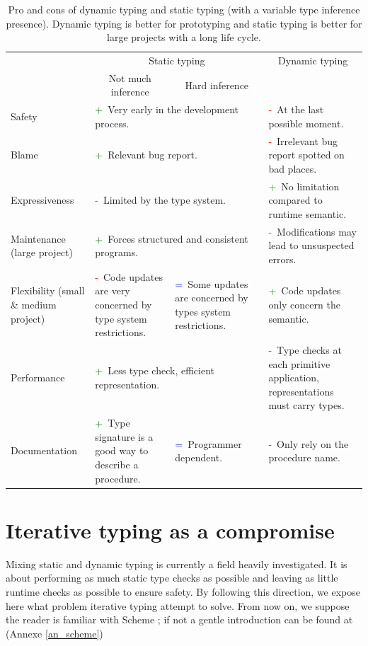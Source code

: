 \documentclass[a4paper]{report}
\newcommand{\pro}[0]{\textcolor{green}{+}~}
\newcommand{\cons}[0]{\textcolor{red}{-}~}
\newcommand{\even}[0]{\textcolor{blue}{=}~}
\newcommand{\refan}[1]{(Annexe \ref{#1})}
\begin{document}
\begin{table}
\centering
\begin{tabular}{|p{3.5cm}|p{3.5cm}|p{3.5cm}|p{3.5cm}|}
\hline
& \multicolumn{2}{|c|}{Static typing} & \multicolumn{1}{|c|}{Dynamic typing}\\
& \multicolumn{1}{|c|}{Not much inference} & \multicolumn{1}{|c|}{Hard inference} &\\ 
\hline
\hline
Safety & \multicolumn{2}{|p{7cm}|}{\pro Very early in the development process.}&\cons At the last possible moment.\\
\hline
Blame &\multicolumn{2}{|p{7cm}|}{\pro Relevant bug report.} &\cons Irrelevant bug report spotted on bad places.\\
\hline
Expressiveness &\multicolumn{2}{|p{7cm}|}{\cons Limited by the type system.}&\pro No limitation compared to runtime semantic.\\
\hline
Maintenance (large project) &\multicolumn{2}{|p{7cm}|}{\pro Forces structured and consistent programs.}&\cons Modifications may lead to unsuspected errors.\\
\hline
Flexibility (small \& medium project) & \cons Code updates are very concerned by type system restrictions. & \even Some updates are concerned by types system restrictions. & \pro Code updates only concern the semantic. \\
\hline
Performance &\multicolumn{2}{|p{7cm}|}{\pro Less type check, efficient representation.}&\cons Type checks at each primitive application, representations must carry types.\\
\hline
Documentation &\pro Type signature is a good way to describe a procedure. &\even Programmer dependent. &\cons Only rely on the procedure name.\\
\hline
\end{tabular}
\caption{Pro and cons of dynamic typing and static typing (with a variable type inference presence). Dynamic typing is better for prototyping and static typing is better for large projects with a long life cycle.}
\label{pc_stat_dyn}
\end{table}

\section{Iterative typing as a compromise}

Mixing static and dynamic typing is currently a field heavily investigated. It is about performing as much static type checks as possible and leaving as little runtime checks as possible to ensure safety. By following this direction, we expose here what problem iterative typing attempt to solve. From now on, we suppose the reader is familiar with Scheme ; if not a gentle introduction can be found at \refan{an_scheme}
\end{document}
